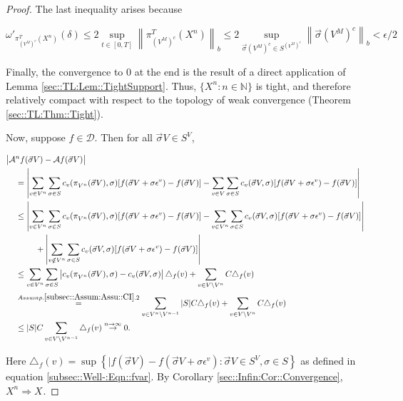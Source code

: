 \documentclass[12pt]{article}
\newcommand{\mb}{\mathbb}
\newcommand{\mc}{\mathcal}
\newcommand{\ra}{\rightarrow}
\newcommand{\os}{\overset}
\newcommand{\ep}{\epsilon}
\newcommand{\ind}{\hspace{24pt}}
\renewcommand{\v}{v}							%
\renewcommand{\S}{S}							%
\newcommand{\s}{\sigma}							%
\newcommand{\sv}{\vec{\s}}						%
\renewcommand{\b}{b}							%
\newcommand{\ev}[1]{\ep^{#1}}					%
\newcommand{\T}{T}								%
\renewcommand{\t}{t}							%
\newcommand{\IG}{\mc{A}}						%
\newcommand{\pup}[1]{^{#1}}							%
\newcommand{\core}{\mc{D}}							%
\newcommand{\V}{V}									%
\newcommand{\numb}{n}								%
\newcommand{\XState}[1]{\S^{#1}}				%
\newcommand{\piV}[2]{\pi_{#1}^{#2}}					%
\newcommand{\rxvts}[2]{X_{#1}{#2}}					%
\newcommand{\rxvtsn}[3]{X_{#1}^{#3}{#2}}			%
\newcommand{\IGr}[1]{c_{#1}}						%
\newcommand{\const}[1]{C_{#1}}						%
\begin{document}
\begin{proof}
The last inequality arises because

\[\omega'_{\piV{\left(\V\pup{M}\right)^c}{\T}(\rxvtsn{}{}{\numb})}(\delta) \leq 2 \sup_{\t\in [0,\T]} \left\|\piV{\left(\V\pup{M}\right)^c}{\T}(\rxvtsn{}{}{\numb})\right\|_{\b{}} \leq 2 \sup_{\sv{}{\left(\V\pup{M}\right)^c} \in \S^{\left(\V\pup{M}\right)^c}} \left\|\sv{}{\left(\V\pup{M}\right)^c}\right\|_{\b{}} < \ep/2\]

Finally, the convergence to 0 at the end is the result of a direct application of Lemma \ref{sec::TL:Lem::TightSupport}. Thus, \(\{\rxvtsn{}{}{\numb}:\numb\in \mb{N}\}\) is tight, and therefore relatively compact with respect to the topology of weak convergence (Theorem \ref{sec::TL:Thm::Tight}).

Now, suppose \(f\in \core\). Then for all \(\sv{}{\V} \in \S^\V\),

\begin{align*}
\big|\IG&\pup{\numb}f(\sv{}{\V}) - \IG f(\sv{}{\V})\big|\\
&= \left|\sum_{\v \in \V\pup{\numb}} \sum_{\s \in \S} \IGr{\v}(\piV{\V\pup{\numb}}{}(\sv{}{\V}),\s)[f(\sv{}{\V}+\s\ev{\v}) - f(\sv{}{\V})] - \sum_{\v \in \V}\sum_{\s \in \S} \IGr{\v}(\sv{}{\V},\s)[f(\sv{}{\V}+\s\ev{\v}) - f(\sv{}{\V})]\right|\\
&\leq  \left|\sum_{\v \in \V\pup{\numb}} \sum_{\s \in \S} \IGr{\v}(\piV{\V\pup{\numb}}{}(\sv{}{\V}),\s)[f(\sv{}{\V}+\s\ev{\v}) - f(\sv{}{\V})] - \sum_{\v \in \V\pup{\numb}}\sum_{\s \in \S} \IGr{\v}(\sv{}{\V},\s)[f(\sv{}{\V}+\s\ev{\v}) - f(\sv{}{\V})]\right|\\
&\ind  +\left|\sum_{\v \notin \V\pup{\numb}} \sum_{\s\in \S} \IGr{\v}(\sv{}{\V},\s)[f(\sv{}{\V}+\s\ev{\v}) - f(\sv{}{\V})]\right|\\
&\leq \sum_{\v \in \V\pup{\numb}}\sum_{\s \in \S} \left|\IGr{\v}(\piV{\V\pup{\numb}}{}(\sv{}{\V}),\s) - \IGr{\v}(\sv{}{\V},\s)\right|\triangle_f(\v) + \sum_{\v \in \V\setminus \V\pup{\numb}} \const{}\triangle_f(\v)\\
&\os{Assump. \ref{subsec::Assum:Assu::CI}.2}{=} \sum_{\v \in \V\pup{\numb}\setminus\V\pup{\numb-1}} |\S|\const{} \triangle_f(\v) + \sum_{\v \in \V\setminus \V\pup{\numb}} \const{}\triangle_f(\v)\\
&\leq |\S|C\sum_{\v \in \V\setminus \V\pup{\numb-1}} \triangle_f(\v) \os{n\ra\infty}{\ra} 0.
\end{align*}

Here \(\triangle_f(\v) = \sup\left\{|f(\sv{}{\V}) - f(\sv{}{\V} + \s\ev{\v}): \sv{}{\V}\in \S^\V,\s \in \S\right\}\) as defined in equation \eqref{subsec::Well-:Eqn::fvar}. By Corollary \ref{sec::Infin:Cor::Convergence}, \(\rxvtsn{}{}{\numb}\Rightarrow \rxvts{}{}\).
\end{proof}
\end{document}
